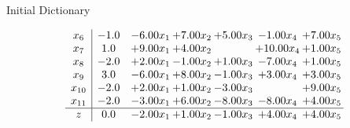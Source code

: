\documentclass[8pt]{article}
\begin{document}
Initial Dictionary 

\[\begin{array}{c| c c@{\hskip 2pt} c@{\hskip 2pt} c@{\hskip 2pt} c@{\hskip 2pt} c@{\hskip 2pt} }
 x_{6}   &  -1.0 & -6.00 x_{1} & +  7.00 x_{2} & +  5.00 x_{3} & -1.00 x_{4} & +  7.00 x_{5}\\
 x_{7}   &  1.0 & +  9.00 x_{1} & +  4.00 x_{2} &   & + 10.00 x_{4} & +  1.00 x_{5}\\
 x_{8}   &  -2.0 & +  2.00 x_{1} & -1.00 x_{2} & +  1.00 x_{3} & -7.00 x_{4} & +  1.00 x_{5}\\
 x_{9}   &  3.0 & -6.00 x_{1} & +  8.00 x_{2} & -1.00 x_{3} & +  3.00 x_{4} & +  3.00 x_{5}\\
 x_{10}   &  -2.0 & +  2.00 x_{1} & +  1.00 x_{2} & -3.00 x_{3} &   & +  9.00 x_{5}\\
 x_{11}   &  -2.0 & -3.00 x_{1} & +  6.00 x_{2} & -8.00 x_{3} & -8.00 x_{4} & +  4.00 x_{5}\\
\hline
z    &  0.0 & -2.00 x_{1} & +  1.00 x_{2} & -1.00 x_{3} & +  4.00 x_{4} & +  4.00 x_{5}\\
\end{array}\]
\end{document}
